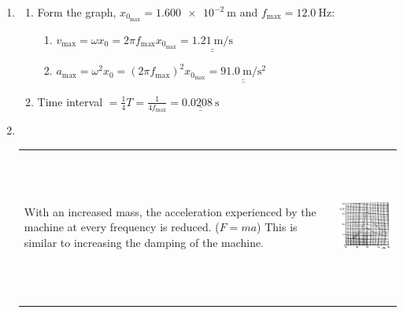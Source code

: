 \documentclass[11pt]{article}
\def\doubleunderline#1{\underline{\underline{#1}}}
\begin{document}
\begin{enumerate}[label={[D\arabic*]},itemsep={1em}]
\begin{enumerate}
					\begin{enumerate}[label={(\roman*)}]
						\item A forced oscillation is one that is under the influence of/driven by an external periodic force. 
						\item The effect illustrated is that of \textit{resonance}.
					\end{enumerate}
				\vspace{1.5em}
				\item 
					\begin{enumerate}[label={(\roman*)}]
						\item Form the graph, $x_{0_\text{max}} = \SI{1.600e-2}{\meter}$ and $f_\text{max} = \SI{12.0}{\hertz}$:
							\begin{enumerate}[label={\arabic*.}]
								\item $v_\text{max} = \omega x_0 = 2\pi\!f_\text{max}x_{0_\text{max}} = \doubleunderline{\SI{1.21}{\meter\per\second}}$
								\item $a_\text{max} = \omega^2 x_0 = \left(2\pi\!f_\text{max}\right)^2\!x_{0_\text{max}} = \doubleunderline{\SI{91.0}{\meter\per\second\squared}}$
							\end{enumerate}
						\item Time interval $=\frac{1}{4}T = \frac{1}{4f_\text{max}} = \doubleunderline{\SI{0.0208}{\second}}$
					\end{enumerate}
				\vspace{1.5em}
				\item \textcolor{white}{.}
				
					\vspace{-1.7\baselineskip}
					{	
						\renewcommand{\arraystretch}{1.5}
						\begin{tabular}{p{8cm}r@{}}
							With an increased mass, the acceleration experienced by the machine at every frequency is reduced. ($F = ma$) This is similar to increasing the damping of the machine.
							&
							\multirow{2}{*}{\includegraphics[height=5cm]{D13c.png}}\\
							

\end{tabular}}
\end{enumerate}
\end{enumerate}
\end{document}
